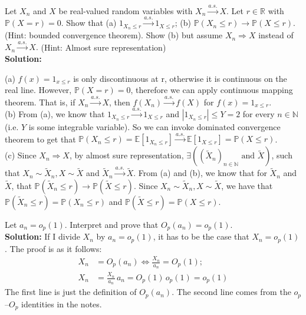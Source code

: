 \documentclass[11pt,letterpaper]{article}                  %
\begin{document}
\bigskip

\begin{problem} Let $X_n$ and $X$ be real-valued random variables with $X_n \xrightarrow{a.s.} X.$ Let $r \in \mathbb{R}$ with $\mathbb{P}(X = r) = 0$. Show that 
	(a) $1_{X_n \leq r} \xrightarrow{a.s.} 1_{X \leq r}$;
	(b) $\mathbb{P}(X_n \leq r) \rightarrow \mathbb{P}(X \leq r)$. (Hint: bounded convergence theorem).
	Show (b) but assume $X_n \Rightarrow X$ instead of $X_n \xrightarrow{a.s.} X.$ (Hint: Almost sure representation) \\
	
\textbf{Solution:}	

	(a) $f(x) = 1_{x \leq r}$ is only discontinuous at r, otherwise it is continuous on the real line. However, $\mathbb{P}(X = r) = 0$, therefore we can apply continuous mapping theorem. That is, if $X_n \xrightarrow{a.s.} X$, then $f(X_n) \xrightarrow{a.s.} f(X)$ for $f(x) = 1_{x \leq r}$. \\
	
	(b) From (a), we know that $1_{X_n \leq r} \xrightarrow{a.s.} 1_{X \leq r}$ and $|1_{X_n \leq r}| \leq Y = 2$ for every $n \in \mathbb{N}$ (i.e. $Y$ is some integrable variable). So we can invoke dominated convergence theorem to get that $\mathbb{P}(X_n \leq r) = \mathbb{E}\left[1_{X_n \leq r}\right] \xrightarrow{a.s.} \mathbb{E}\left[1_{X \leq r}\right] = \mathbb{P}(X \leq r)$. \\ 
	
	(c) Since $X_n \Rightarrow X$, by almost sure representation, $\exists \left( (\tilde{X}_n)_{n \in \mathbb{N}} \text{ and } \tilde{X} \right)$, such that $X_n \sim \tilde{X}_n, X \sim \tilde{X}$ and $\tilde{X}_n \xrightarrow{a.s.} \tilde{X}.$ From (a) and (b), we know that for $\tilde{X}_n$ and $\tilde{X}$, that $\mathbb{P}(\tilde{X}_n \leq r) \rightarrow \mathbb{P}(\tilde{X} \leq r)$. Since $X_n \sim \tilde{X}_n, X \sim \tilde{X}$, we have that $\mathbb{P}(\tilde{X}_n \leq r) = \mathbb{P}(X_n \leq r)$ and $\mathbb{P}(\tilde{X} \leq r) = \mathbb{P}(X \leq r)$.
\end{problem}

\bigskip
\begin{problem}
Let $a_n = o_p(1)$.
Interpret and prove that $O_p(a_n) = o_p(1)$. \\

\textbf{Solution:} If I divide $X_n$ by $a_n = o_p(1)$, it has to be the case that $X_n  = o_p(1)$.
The proof is as it follows:
\begin{align*}
  X_n &= O_p (a_n) \iff \frac{X_n}{a_n} = O_p(1); \\
  X_n &= \frac{X_n}{a_n} \, a_n = O_p(1) \, o_p(1) = o_p(1)
\end{align*}
The first line is just the definition of $O_p(a_n)$.
The second line comes from the $o_p$--$O_p$ identities in the notes.
\end{problem}
\end{document}
